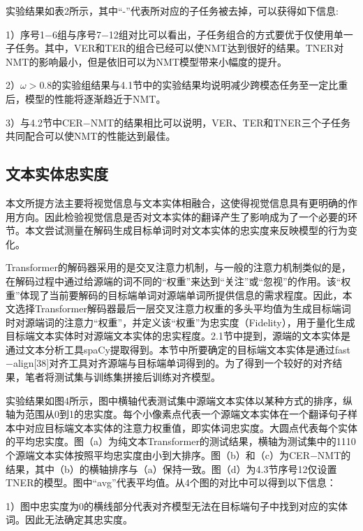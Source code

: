 实验结果如表2所示，其中“-”代表所对应的子任务被去掉，可以获得如下信息:


1）序号1$-$6组与序号7$-$12组对比可以看出，子任务组合的方式要优于仅使用单一子任务。其中，VER和TER的组合已经可以使NMT达到很好的结果。TNER对NMT的影响最小，但是依旧可以为NMT模型带来小幅度的提升。

2）$\omega>0.8$的实验组结果与4.1节中的实验结果均说明减少跨模态任务至一定比重后，模型的性能将逐渐趋近于NMT。

3）与4.2节中CER$-$NMT的结果相比可以说明，VER、TER和TNER三个子任务共同配合可以使NMT的性能达到最佳。


\subsection{文本实体忠实度}

本文所提方法主要将视觉信息与文本实体相融合，这使得视觉信息具有更明确的作用方向。因此检验视觉信息是否对文本实体的翻译产生了影响成为了一个必要的环节。本文尝试测量在解码生成目标单词时对文本实体的忠实度来反映模型的行为变化。

Transformer的解码器采用的是交叉注意力机制，与一般的注意力机制类似的是，在解码过程中通过给源端的词不同的“权重”来达到“关注”或“忽视”的作用。该“权重”体现了当前要解码的目标端单词对源端单词所提供信息的需求程度。因此，本文选择Transformer解码器最后一层交叉注意力权重的多头平均值为生成目标端词时对源端词的注意力“权重”，并定义该“权重”为忠实度（Fidelity），用于量化生成目标端文本实体时对源端文本实体的忠实程度。2.1节中提到，源端的文本实体是通过文本分析工具spaCy提取得到。本节中所要确定的目标端文本实体是通过fast$-$align[38]对齐工具对齐源端与目标端单词得到的。为了得到一个较好的对齐结果，笔者将测试集与训练集拼接后训练对齐模型。

实验结果如图4所示，图中横轴代表测试集中源端文本实体以某种方式的排序，纵轴为范围从0到1的忠实度。每个小像素点代表一个源端文本实体在一个翻译句子样本中对应目标端文本实体的注意力权重值，即实体词忠实度。大圆点代表每个实体的平均忠实度。图（a）为纯文本Transformer的测试结果，横轴为测试集中的1110个源端文本实体按照平均忠实度由小到大排序。图（b）和（c）为CER$-$NMT的结果，其中（b）的横轴排序与（a）保持一致。图（d）为4.3节序号12仅设置TNER的模型。图中“avg”代表平均值。从4个图的对比中可以得到以下信息：

1）图中忠实度为0的横线部分代表对齐模型无法在目标端句子中找到对应的实体词。因此无法确定其忠实度。

